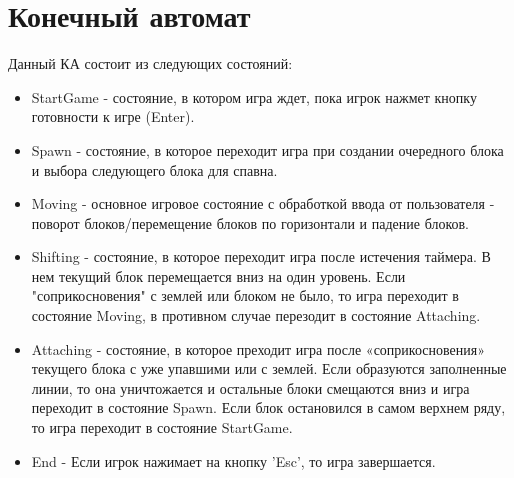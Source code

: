\documentclass{article}
\begin{document}
\section{Конечный автомат}
Данный КА состоит из следующих состояний:
\begin{itemize}
    \item StartGame - состояние, в котором игра ждет, пока игрок нажмет кнопку готовности к игре (Enter).
    \item Spawn - состояние, в которое переходит игра при создании очередного блока и выбора следующего блока для спавна.
    \item Moving - основное игровое состояние с обработкой ввода от пользователя - поворот блоков/перемещение блоков по горизонтали и падение блоков.
    \item Shifting - состояние, в которое переходит игра после истечения таймера. В нем текущий блок перемещается вниз на один уровень. Если "соприкосновения" с землей или блоком не было, то игра переходит в состояние Moving, в противном случае перезодит в состояние Attaching.
    \item Attaching - состояние, в которое преходит игра после «соприкосновения» текущего блока с уже упавшими или с землей. Если образуются заполненные линии, то она уничтожается и остальные блоки смещаются вниз и игра переходит в состояние Spawn. Если блок остановился в самом верхнем ряду, то игра переходит в состояние StartGame.
    \item End - Если игрок нажимает на кнопку 'Esc', то игра завершается.
\end{itemize}
\end{document}
